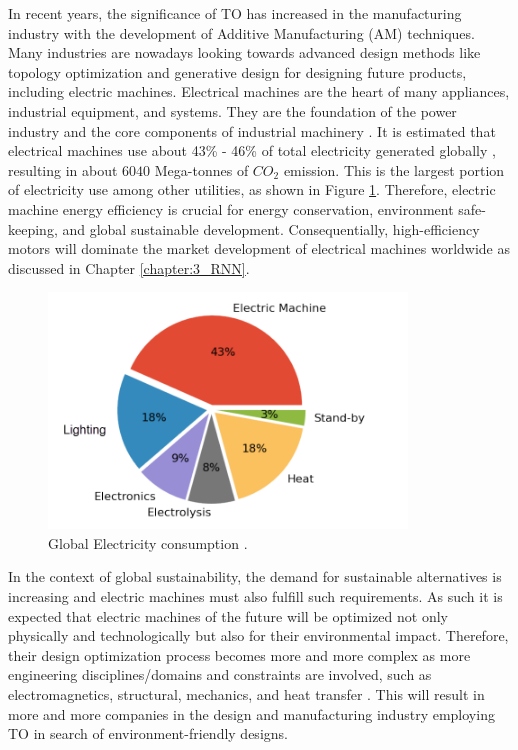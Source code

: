 In recent years, the significance of TO has increased in the manufacturing industry with the development of Additive Manufacturing (AM) techniques. Many industries are nowadays looking towards advanced design methods like topology optimization and generative design \parencite{atkinson2019manufacturing, Coop2018} for designing future products, including electric machines. Electrical machines are the heart of many appliances, industrial equipment, and systems. They are the foundation of the power industry and the core components of industrial machinery \parencite{lei2017review}. It is estimated that electrical machines use about 43\% - 46\% of total electricity generated globally \parencite{waide2011energy}, resulting in about $6040$ Mega-tonnes of $CO_2$ emission.
This is the largest portion of electricity use among other utilities, as shown in Figure \ref{fig:MDP_Fig2_electrcity_consumption}. Therefore, electric machine energy efficiency is crucial for energy conservation, environment safe-keeping, and global sustainable development. Consequentially, high-efficiency motors will dominate the market development of electrical machines worldwide as discussed in Chapter \ref{chapter:3_RNN}.

\begin{figure}[h!]
    \centering
    \includegraphics[width=0.85\textwidth]{Figures/Ch_MDP/MDP_Fig2_electrcity_consumption.png}
    \caption{Global Electricity consumption \parencite{lei2017review}.}
    \label{fig:MDP_Fig2_electrcity_consumption}
\end{figure}

In the context of global sustainability, the demand for sustainable alternatives is increasing and electric machines must also fulfill such requirements. As such it is expected that electric machines of the future will be optimized not only physically and technologically but also for their environmental impact. Therefore, their design optimization process becomes more and more complex as more engineering disciplines/domains and constraints are involved, such as electromagnetics, structural, mechanics, and heat transfer \parencite{lei2017review}. This will result in more and more companies in the design and manufacturing industry employing TO in search of environment-friendly designs.

